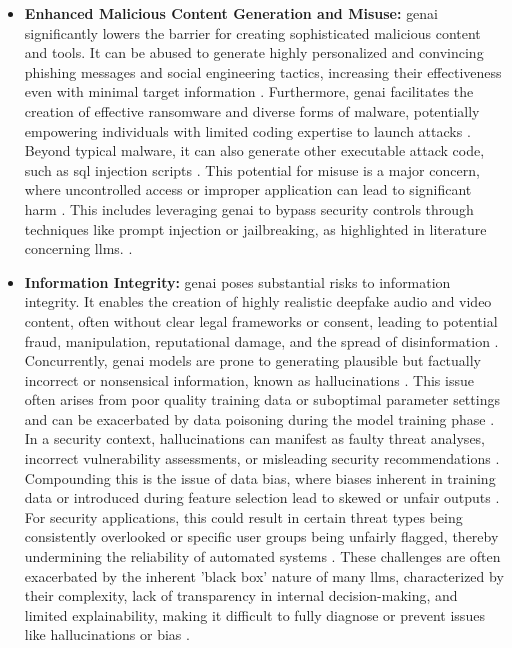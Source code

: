 \begin{itemize}
\item \textbf{Enhanced Malicious Content Generation and Misuse:} \gls{genai} significantly lowers the barrier for creating sophisticated malicious content and tools. It can be abused to generate highly personalized and convincing phishing messages and social engineering tactics, increasing their effectiveness even with minimal target information \cite{nyoto_cyber_2024}. Furthermore, \gls{genai} facilitates the creation of effective ransomware and diverse forms of malware, potentially empowering individuals with limited coding expertise to launch attacks \cite{nyoto_cyber_2024}. Beyond typical malware, it can also generate other executable attack code, such as \gls{sql} injection scripts \cite{nyoto_cyber_2024}. This potential for misuse is a major concern, where uncontrolled access or improper application can lead to significant harm \cite{surathunmanun_exploring_2024}. This includes leveraging \gls{genai} to bypass security controls through techniques like prompt injection or jailbreaking, as highlighted in literature concerning \glspl{llm}. \cite{surathunmanun_exploring_2024}.

\item \textbf{Information Integrity:} \gls{genai} poses substantial risks to information integrity. It enables the creation of highly realistic deepfake audio and video content, often without clear legal frameworks or consent, leading to potential fraud, manipulation, reputational damage, and the spread of disinformation \cite{nyoto_cyber_2024}. Concurrently, \gls{genai} models are prone to generating plausible but factually incorrect or nonsensical information, known as hallucinations \cite{nyoto_cyber_2024, surathunmanun_exploring_2024}. This issue often arises from poor quality training data or suboptimal parameter settings \cite{surathunmanun_exploring_2024} and can be exacerbated by data poisoning during the model training phase \cite{nyoto_cyber_2024}. In a security context, hallucinations can manifest as faulty threat analyses, incorrect vulnerability assessments, or misleading security recommendations \cite{surathunmanun_exploring_2024}. Compounding this is the issue of data bias, where biases inherent in training data or introduced during feature selection lead to skewed or unfair outputs \cite{surathunmanun_exploring_2024}. For security applications, this could result in certain threat types being consistently overlooked or specific user groups being unfairly flagged, thereby undermining the reliability of automated systems \cite{surathunmanun_exploring_2024}. These challenges are often exacerbated by the inherent 'black box' nature of many \glspl{llm}, characterized by their complexity, lack of transparency in internal decision-making, and limited explainability, making it difficult to fully diagnose or prevent issues like hallucinations or bias \cite{dash_zero-trust_2024}.


\end{itemize}
